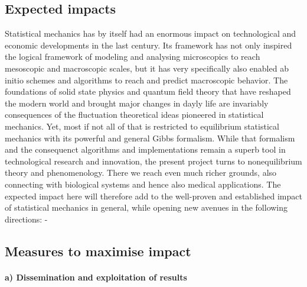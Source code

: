 \subsection{Expected impacts}

Statistical mechanics has by itself had an enormous impact on technological and economic developments in the last century.  Its framework has not only inspired the logical framework of modeling and analysing microscopics to reach mesoscopic and macroscopic scales, but it has very specifically also enabled ab initio schemes and algorithms to reach and predict macroscopic behavior.  The foundations of solid state physics and quantum field theory that have reshaped the modern world and brought major changes in dayly life are invariably consequences of the fluctuation theoretical ideas pioneered in statistical mechanics.  Yet, most if not all of that is restricted to equilibrium statistical mechanics with its powerful and general Gibbs formalism.  While that formalism and the consequenct algorithms and implementations remain a superb tool in technological research and innovation, the present project turns to nonequilibrium theory and phenomenology.  There we reach even much richer grounds, also connecting with biological systems and hence also medical applications.  The expected impact here will therefore add to the well-proven and established impact of statistical mechanics in general, while opening new avenues in the following directions:
-
\subsection{Measures to maximise impact}

\paragraph{a) Dissemination and exploitation of results}

